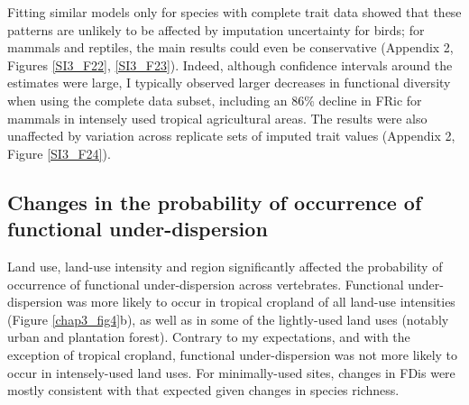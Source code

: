 Fitting similar models only for species with complete trait data showed that these patterns are unlikely to be affected by imputation uncertainty for birds; for mammals and reptiles, the main results could even be conservative (Appendix 2, Figures \ref{SI3_F22}, \ref{SI3_F23}). Indeed, although confidence intervals around the estimates were large, I typically observed larger decreases in functional diversity when using the complete data subset, including an 86\% decline in FRic for mammals in intensely used tropical agricultural areas. The results were also unaffected by variation across replicate sets of imputed trait values (Appendix 2, Figure \ref{SI3_F24}).


\subsection{Changes in the probability of occurrence of functional under-dispersion}

Land use, land-use intensity and region significantly affected the probability of occurrence of functional under-dispersion across vertebrates. Functional under-dispersion was more likely to occur in tropical cropland of all land-use intensities (Figure \ref{chap3_fig4}b), as well as in some of the lightly-used land uses (notably urban and plantation forest). Contrary to my expectations, and with the exception of tropical cropland, functional under-dispersion was not more likely to occur in intensely-used land uses. For minimally-used sites, changes in FDis were mostly consistent with that expected given changes in species richness.

